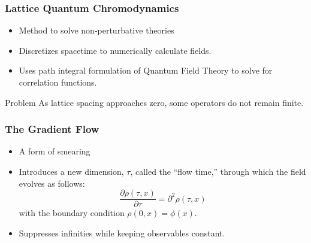 \documentclass{beamer}
\begin{document}
\begin{frame}
\frametitle{Lattice Quantum Chromodynamics}
\begin{itemize}
    \item Method to solve non-perturbative theories
    \item Discretizes spacetime to numerically calculate fields.
    \item Uses path integral formulation of Quantum Field Theory to solve for correlation functions.
\end{itemize}

\begin{block}{Problem}
    As lattice spacing approaches zero, some operators do not remain finite. 
\end{block}
\end{frame}

\begin{frame}
\frametitle{The Gradient Flow}
\begin{itemize}
    \item A form of smearing
    \item Introduces a new dimension, $\tau$, called the ``flow time,'' through which the field evolves as follows:
    \begin{equation}
        \frac{\partial \rho(\tau, x)}{\partial \tau} = \partial^2 \rho(\tau,x)
    \end{equation}
    with the boundary condition $\rho(0, x)=\phi(x)$.

    \item Suppresses infinities while keeping observables constant.


\end{itemize}
\end{frame}
\end{document}
